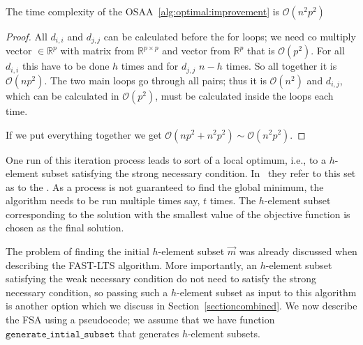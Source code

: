 \begin{observation} 
     The time complexity of the OSAA~\ref{alg:optimal:improvement} is $\mathcal{O}(n^2p^2)$
\end{observation} 


\begin{proof}
All $d_{i,i}$ and $d_{j,j}$ can be calculated before the for loops; we need co multiply vector $\in \mathbb{R}^p$ with matrix from  $\mathbb{R}^{p \times p}$ and vector from $\mathbb{R}^p$ that is $\mathcal{O}(p^2)$. For all $d_{i,i}$ this have to be done $h$ times and for $d_{j,j}$ $n-h$ times. So all together it is $\mathcal{O}(np^2)$. The two main loops go through all pairs; thus it is $\mathcal{O}(n^2)$ and $d_{i,j}$, which can be calculated in $\mathcal{O}(p^2)$, must be calculated inside the loops each time.

If we put everything together we get 
$\mathcal{O}(np^2 + n^2p^2) \sim \mathcal{O}(n^2p^2)$.
\end{proof}


One run of this iteration process leads to sort of a local optimum, i.e., to a $h$-element subset satisfying the strong necessary condition. In~\cite{hawkins:1994} they refer to this set as to the .
As a process is not guaranteed to find the global minimum, the algorithm needs to be run multiple times say, $t$ times. The $h$-element subset corresponding to the solution with the smallest value of the objective function is chosen as the final solution.

The problem of finding the initial $h$-element subset $\vec{m}$ was already discussed when describing the FAST-LTS algorithm.
More importantly, an $h$-element subset satisfying the weak necessary condition do not need to satisfy the strong necessary condition, so passing such a $h$-element subset as input to this algorithm is another option which we discuss in Section~\ref{sectioncombined}. We now describe the FSA using a pseudocode; we assume that we have function $\texttt{generate\_intial\_subset}$ that generates $h$-element subsets. 

\newcommand\mycommfont[1]{\footnotesize\ttfamily\textcolor{blue}{#1}}

